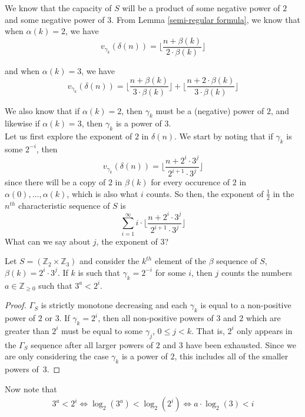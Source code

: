 We know that the capacity of $S$ will be a product of some negative power of $2$ and some negative power of $3$.  From Lemma \ref{semi-regular formula}, we know that when $\alpha(k)=2$, we have\\ 
\[v_{\gamma_k}(\delta(n)) = \lfloor \frac{n + \beta(k)}{2\cdot \beta(k)} \rfloor\]

and when $\alpha(k)=3$, we have\\
\[v_{\gamma_k}(\delta(n)) = \lfloor \frac{n + \beta(k)}{3\cdot \beta(k)} \rfloor + \lfloor \frac{n + 2\cdot \beta(k)}{3\cdot \beta(k)} \rfloor \]

We also know that if $\alpha(k)=2$, then $\gamma_k$ must be a (negative) power of $2$, and likewise if $\alpha(k)=3$, then $\gamma_k$ is a power of $3$.\\

Let us first explore the exponent of $2$ in $\delta(n)$. We start by noting that if $\gamma_k$ is some $2^{-i}$, then \[v_{\gamma_k}(\delta(n)) =\lfloor \frac{n + 2^i\cdot 3 ^j}{2^{i+1} \cdot 3^j} \rfloor \] since there will be a copy of $2$ in $\beta(k)$ for every occurence of $2$ in $\alpha(0),\ldots,\alpha(k)$, which is also what $i$ counts. So then, the exponent of $\frac{1}{2}$ in the $n^{th}$ characteristic sequence of $S$ is \[ \sum_{i=1}^\infty i \cdot \lfloor\frac{n + 2^i \cdot 3^j}{2^{i+1}\cdot 3^j} \rfloor\] What can we say about $j$, the exponent of $3$?\\ 

\begin{lemma}
Let $S = (\mathbb{Z}_{2} \times \mathbb{Z}_{3}) $ and consider the $k^{th}$ element of the $\beta$ sequence of $S$, $\beta(k) = 2^i \cdot 3^j$. If $k$ is such that $\gamma_k=2^{-i}$ for some $i$, then $j$ counts the numbers $a \in \mathbb{Z}_{\geq 0}$ such that $3^a < 2^{i}$.
\end{lemma}

\begin{proof}
$\Gamma_S$ is strictly monotone decreasing and each $\gamma_k$ is equal to a non-positive power of $2$ or $3$. If $\gamma_k = 2^i$, then all non-positive powers of $3$ and $2$ which are greater than $2^i$ must be equal to some $\gamma_j$, $0 \leq j < k$. That is, $2^i$ only appears in the $\Gamma_S$ sequence after all larger powers of $2$ and $3$ have been exhausted. Since we are only considering the case $\gamma_k$ is a power of $2$, this includes all of the smaller powers of~$3$.
\end{proof}

 Now note that\\ 
\begin{align*}
3^a < 2^i
 \iff
 \log_2(3^a) < \log_2(2^i)
\iff  
a \cdot \log_2(3) < i
\end{align*}

